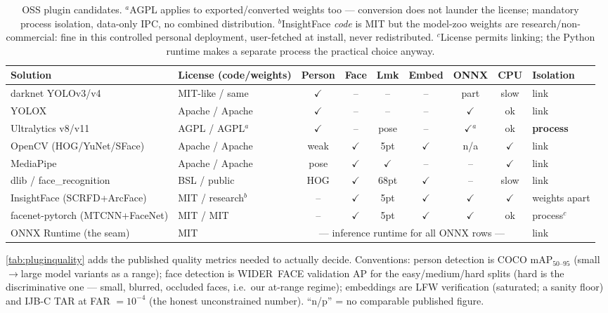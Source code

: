 \documentclass[11pt]{article}
\theoremstyle{definition}
\begin{document}
\begin{table}[ht]
\centering
\scriptsize
\setlength{\tabcolsep}{2.5pt}
\newcommand{\cm}{$\checkmark$}
\begin{tabular}{l l c c c c c c l}
\toprule
Solution & License (code/weights) & Person & Face & Lmk & Embed & ONNX & CPU & Isolation \\
\midrule
darknet YOLOv3/v4 & MIT-like / same & \cm & -- & -- & -- & part & slow & link \\
YOLOX & Apache / Apache & \cm & -- & -- & -- & \cm & ok & link \\
Ultralytics v8/v11 & AGPL / AGPL$^{a}$ & \cm & -- & pose & -- & \cm$^{a}$ & ok & \textbf{process} \\
OpenCV (HOG/YuNet/SFace) & Apache / Apache & weak & \cm & 5pt & \cm & n/a & \cm & link \\
MediaPipe & Apache / Apache & pose & \cm & \cm & -- & -- & \cm & link \\
dlib / face\_recognition & BSL / public & HOG & \cm & 68pt & \cm & -- & slow & link \\
InsightFace (SCRFD+ArcFace) & MIT / research$^{b}$ & -- & \cm & 5pt & \cm & \cm & \cm & weights apart \\
facenet-pytorch (MTCNN+FaceNet) & MIT / MIT & -- & \cm & 5pt & \cm & \cm & ok & process$^{c}$ \\
ONNX Runtime (the seam) & MIT & \multicolumn{6}{c}{--- inference runtime for all ONNX rows ---} & link \\
\bottomrule
\end{tabular}
\caption{OSS plugin candidates. $^{a}$AGPL applies to exported/converted
weights too --- conversion does not launder the license; mandatory
process isolation, data-only IPC, no combined distribution.
$^{b}$InsightFace \emph{code} is MIT but the model-zoo weights are
research/non-commercial: fine in this controlled personal deployment,
user-fetched at install, never redistributed. $^{c}$License permits
linking; the Python runtime makes a separate process the practical
choice anyway.}
\label{tab:plugins}
\end{table}

\autoref{tab:pluginquality} adds the published quality metrics needed to
actually decide. Conventions: person detection is COCO mAP$_{50\text{--}95}$
(small$\to$large model variants as a range); face detection is
WIDER~FACE validation AP for the easy/medium/hard splits (hard is the
discriminative one --- small, blurred, occluded faces, i.e.\ our
at-range regime); embeddings are LFW verification \cite{Huang2007}
(saturated; a sanity floor) and IJB-C TAR at FAR $=10^{-4}$
\cite{Maze2018} (the honest unconstrained number). ``n/p'' = no
comparable published figure.
\end{document}
